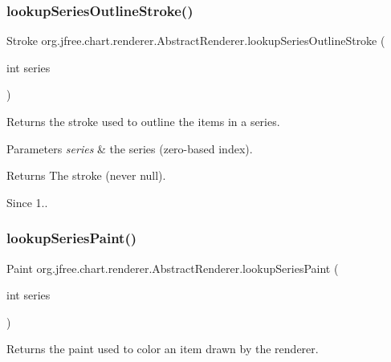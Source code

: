 \subsubsection{\texorpdfstring{lookup\+Series\+Outline\+Stroke()}{lookupSeriesOutlineStroke()}}
{\footnotesize\ttfamily Stroke org.\+jfree.\+chart.\+renderer.\+Abstract\+Renderer.\+lookup\+Series\+Outline\+Stroke (\begin{DoxyParamCaption}\item[{int}]{series }\end{DoxyParamCaption})}

Returns the stroke used to outline the items in a series.


\begin{DoxyParams}{Parameters}
{\em series} & the series (zero-\/based index).\\
\hline
\end{DoxyParams}
\begin{DoxyReturn}{Returns}
The stroke (never {\ttfamily null}).
\end{DoxyReturn}
\begin{DoxySince}{Since}
1.. 
\end{DoxySince}
\mbox{\label{classorg_1_1jfree_1_1chart_1_1renderer_1_1_abstract_renderer_abc231547c7d2059d6158ac21bb5826cf}} 
\subsubsection{\texorpdfstring{lookup\+Series\+Paint()}{lookupSeriesPaint()}}
{\footnotesize\ttfamily Paint org.\+jfree.\+chart.\+renderer.\+Abstract\+Renderer.\+lookup\+Series\+Paint (\begin{DoxyParamCaption}\item[{int}]{series }\end{DoxyParamCaption})}

Returns the paint used to color an item drawn by the renderer.


